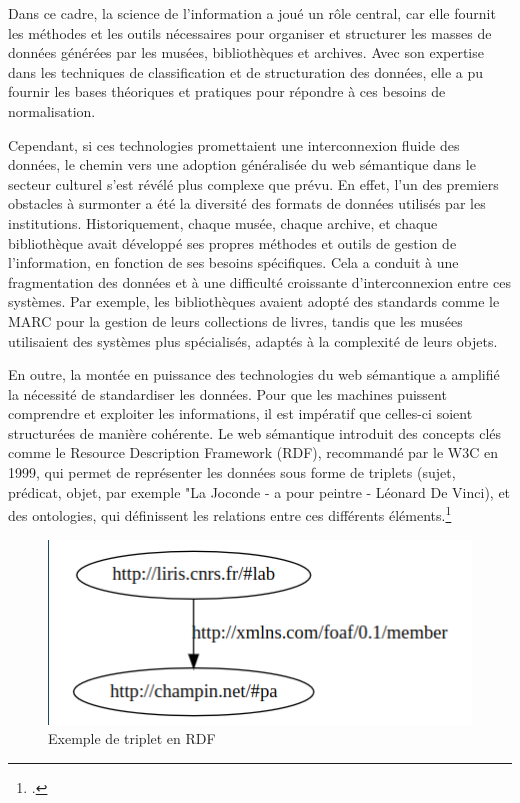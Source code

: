 Dans ce cadre, la science de l’information a joué un rôle central, car elle fournit les méthodes et les outils nécessaires pour organiser et structurer les masses de données générées par les musées, bibliothèques et archives. Avec son expertise dans les techniques de classification et de structuration des données, elle a pu fournir les bases théoriques et pratiques pour répondre à ces besoins de normalisation.\newline

Cependant, si ces technologies promettaient une interconnexion fluide des données, le chemin vers une adoption généralisée du web sémantique dans le secteur culturel s'est révélé plus complexe que prévu.
En effet, l’un des premiers obstacles à surmonter a été la diversité des formats de données utilisés par les institutions. Historiquement, chaque musée, chaque archive, et chaque bibliothèque avait développé ses propres méthodes et outils de gestion de l’information, en fonction de ses besoins spécifiques. Cela a conduit à une fragmentation des données et à une difficulté croissante d’interconnexion entre ces systèmes. Par exemple, les bibliothèques avaient adopté des standards comme le MARC pour la gestion de leurs collections de livres, tandis que les musées utilisaient des systèmes plus spécialisés, adaptés à la complexité de leurs objets.\newline

En outre, la montée en puissance des technologies du web sémantique a amplifié la nécessité de standardiser les données. Pour que les machines puissent comprendre et exploiter les informations, il est impératif que celles-ci soient structurées de manière cohérente. \newline
Le web sémantique introduit des concepts clés comme le Resource Description Framework (RDF), recommandé par le W3C en 1999, qui permet de représenter les données sous forme de triplets (sujet, prédicat, objet, par exemple "La Joconde - a pour peintre - Léonard De Vinci), et des ontologies, qui définissent les relations entre ces différents éléments.\footcite{rdf_champin}

\begin{figure}[h!]
	\centerline{\includegraphics[width=\textwidth] {medias/schema_rdf.png}}
	\caption{Exemple de triplet en RDF}
\end{figure}


